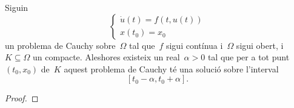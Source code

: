 \documentclass[../../main.tex]{subfiles}
\begin{document}
    \begin{corollary}
        \label{cor:Teorema de Peano}
        Siguin
        \[\begin{cases}
            \displaystyle \dot{u}(t)=f(t,u(t)) \\
            \displaystyle x(t_{0})=x_{0}
        \end{cases}\]
        un problema de Cauchy sobre~\(\Omega\) tal que~\(f\) sigui contínua i~\(\Omega\) sigui obert, i~\(K\subseteq\Omega\) un compacte.
        Aleshores existeix un real~\(\alpha>0\) tal que per a tot punt~\((t_{0},x_{0})\) de~\(K\) aquest problema de Cauchy té una solució sobre l'interval
        \[
            \left[t_{0}-\alpha,t_{0}+\alpha\right].
        \]
        \begin{proof}
        \end{proof}
    \end{corollary}    %
\end{document}
